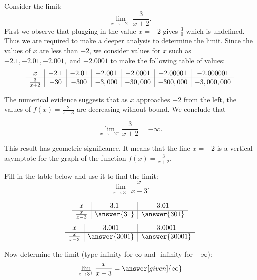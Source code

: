 \documentclass{ximera}
\begin{document}
\begin{example}[example 6]
Consider the limit:
\[\lim_{x \to -2^-} \frac{3}{x+2}. \]
First we observe that plugging in the value $x=-2$ gives $\frac{3}{0}$ which is undefined. 
Thus we are required to make a deeper analysis to determine the limit.
Since the values of $x$ are less than $-2$, we consider values for $x$ such as 
$-2.1, -2.01, -2.001,$ and $-2.0001$ to make the following table of values:\\

\[
\begin{array}{ c | c | c | c | c| c| c}
  x & -2.1 & -2.01 & -2.001 & -2.0001 & -2.00001 & -2.000001\\ 
	\hline  
	 \frac{3}{x+2} & -30 & -300 & -3,000 & -30,000 & -300,000 & -3,000,000
\end{array}
\] 

The numerical evidence suggests that as $x$ approaches $-2$ from the left, 
the values of $f(x) = \frac{2}{x-3}$ are decreasing without bound. We conclude that 

\[\lim_{x \to -2^-} \frac{3}{x+2} =  -\infty. \]

This result has geometric significance.  
It means that the line $x=-2$ is a vertical asymptote for the graph of the function $f(x) = \frac{3}{x+2}.$
\end{example}



\begin{problem}[problem 8]
Fill in the table below and use it to find the limit:
\[\lim_{x \to 3^+} \frac{x}{x-3}.\]

\begin{prompt}
\begin{center}
\[
\begin{array}{ c | c | c }
  x & 3.1 & 3.01   \\ 
	\hline 
	 \frac{x}{x-3} & \answer{31} & \answer{301} 
\end{array}
\]
\[
\begin{array}{ c | c | c  }
  x  & 3.001 & 3.0001 \\ 
	\hline 
	 \frac{x}{x-3}  & \answer{3001} & \answer{30001}
\end{array}
\]
\end{center}
Now determine the limit (type infinity for $\infty$ and -infinity for $-\infty$):
\[
\lim_{x \to 3^+} \frac{x}{x-3} = \answer[given]{\infty}
\]
\end{prompt}
\end{problem}
\end{document}
